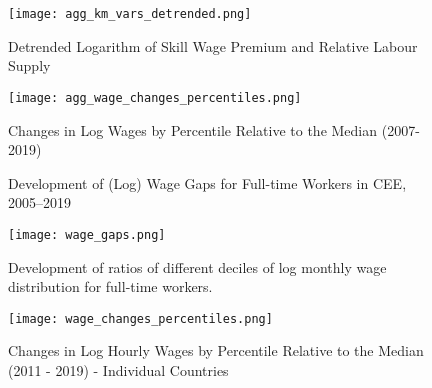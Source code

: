 \documentclass[11pt]{article}
\begin{document}
\begin{figure}[!htbp]%
    \centering
    \caption{Detrended Logarithm of Skill Wage Premium and Relative Labour Supply}
    {\texttt{[image: agg\_km\_vars\_detrended.png]} }
    \label{agg_km_vars_detrended}
\end{figure}




\begin{figure}[!htbp]%
    \centering
    \caption{Changes in Log Wages by Percentile Relative to the Median (2007-2019)}
    {\texttt{[image: agg\_wage\_changes\_percentiles.png]} }
    \label{agg_wage_changes_percentiles}
\end{figure}








\begin{figure}[!htbp]%
    \centering
    \caption{Development of (Log) Wage Gaps for Full-time Workers in CEE, 2005–2019}
    {\texttt{[image: wage\_gaps.png]} }
    \label{wage_gaps_CEE}
    \caption*{\footnotesize Development of ratios of different deciles of log monthly wage distribution for full-time workers. }
\end{figure}

\begin{figure}[!htbp]%
    \centering
    \caption{Changes in Log Hourly Wages by Percentile Relative to the Median (2011 - 2019) - Individual Countries}
    {\texttt{[image: wage\_changes\_percentiles.png]} }
    \label{wage_changes_percentiles}
\end{figure}
\end{document}
